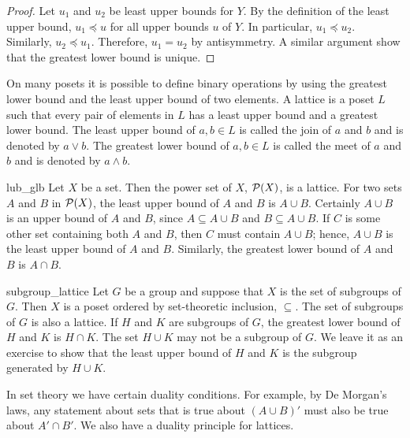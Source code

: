 \begin{proof}
Let $u_1$ and $u_2$ be least upper bounds for $Y$. By the definition
of the least upper bound, $u_1 \preceq u$ for all upper bounds $u$ of
$Y$. In particular, $u_1 \preceq u_2$. Similarly, $u_2 \preceq u_1$.
Therefore, $u_1 = u_2$ by antisymmetry.  A similar argument show that
the greatest lower bound is unique.
\end{proof}
 
 
\medskip
 
 
On many posets it is possible to define binary operations
by using the greatest lower bound and the least upper bound of two
elements. A {\bfi lattice\/} is a poset $L$
such that every pair of elements in $L$ has a least upper bound and a
greatest lower bound. The least upper bound of $a, b \in L$ is called
the {\bfi join\/}\label{join} of $a$ and $b$ and is denoted 
by $a \vee b$.  The greatest lower bound of $a, b \in L$ is called 
the {\bfi meet\/}\label{meet} of $a$ and $b$ and is denoted 
by $a \wedge b$.
 
 

\begin{example}{lub_glb}
Let $X$ be a set. Then the power set of $X$, ${\cal P}(X)$, is a
lattice. For two sets $A$ and $B$ in ${\cal P}(X)$, the least upper
bound of $A$ and $B$ is $A \cup B$. Certainly $A \cup B$ is an upper
bound of $A$ and $B$, since $A \subseteq A \cup B$ and $B \subseteq A
\cup B$.  If $C$ is some other set containing both $A$ and $B$, then
$C$ must contain $A \cup B$; hence, $A \cup B$ is the least upper bound
of $A$ and $B$. Similarly,  the greatest lower bound of $A$ and $B$ is
$A \cap B$.
\end{example}
 
 

\begin{example}{subgroup_lattice}
Let $G$ be a group and suppose that $X$ is the set of subgroups of
$G$.  Then $X$ is a poset ordered by set-theoretic inclusion,
$\subseteq$.  The set of subgroups of $G$ is also a lattice.  If $H$
and $K$ are subgroups of $G$, the greatest lower bound of $H$ and $K$
is $H \cap K$. The set $H \cup K$ may not be a subgroup of $G$.  We
leave it as an exercise to show that the least upper bound of $H$ and
$K$ is the subgroup generated by $H \cup K$. 
\end{example}
 

 
 
In set theory we have certain duality conditions. For example, by De
Morgan's laws, any statement about sets that is true about $(A \cup
B)'$ must also be true about $A' \cap B'$. We also have a duality
principle for lattices. 
 
